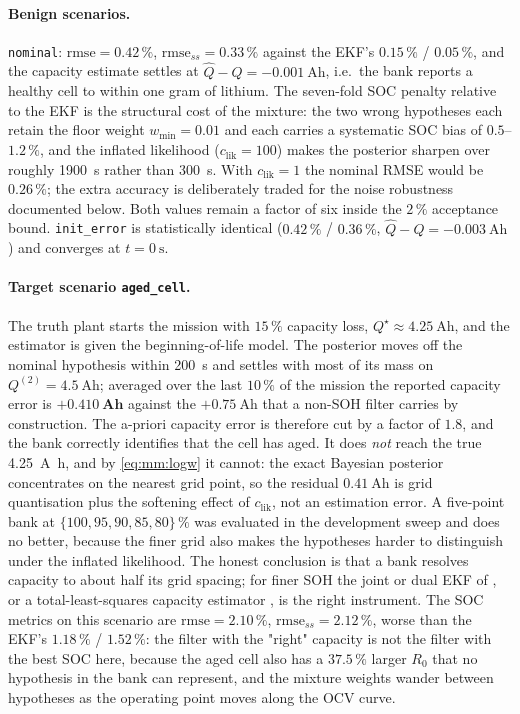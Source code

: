 \paragraph{Benign scenarios.}  \texttt{nominal}: $\mathrm{rmse}=0.42\,\%$,
$\mathrm{rmse}_{ss}=0.33\,\%$ against the EKF's $0.15\,\%$ / $0.05\,\%$, and the capacity estimate
settles at $\hat Q-Q=\SI{-0.001}{\ampere\hour}$, i.e.\ the bank reports a healthy cell to within one
gram of lithium.  The seven-fold SOC penalty relative to the EKF is the structural cost of the
mixture: the two wrong hypotheses each retain the floor weight $w_{\min}=0.01$ and each carries a
systematic SOC bias of $0.5$--$1.2\,\%$, and the inflated likelihood ($c_\mathrm{lik}=100$) makes the
posterior sharpen over roughly \SI{1900}{\second} rather than \SI{300}{\second}.  With
$c_\mathrm{lik}=1$ the nominal RMSE would be $0.26\,\%$; the extra accuracy is deliberately traded for
the noise robustness documented below.  Both values remain a factor of six inside the $2\,\%$
acceptance bound.  \texttt{init\_error} is statistically identical ($0.42\,\%$ / $0.36\,\%$,
$\hat Q-Q=\SI{-0.003}{\ampere\hour}$) and converges at $t=\SI{0}{\second}$.

\paragraph{Target scenario \texttt{aged\_cell}.}  The truth plant starts the mission with $15\,\%$
capacity loss, $Q^\star\approx\SI{4.25}{\ampere\hour}$, and the estimator is given the
beginning-of-life model.  The posterior moves off the nominal hypothesis within \SI{200}{\second} and
settles with most of its mass on $Q^{(2)}=\SI{4.5}{\ampere\hour}$; averaged over the last $10\,\%$ of
the mission the reported capacity error is $\mathbf{+\SI{0.410}{\ampere\hour}}$ against the
$+\SI{0.75}{\ampere\hour}$ that a non-SOH filter carries by construction.  The a-priori capacity error
is therefore cut by a factor of $1.8$, and the bank correctly identifies that the cell has aged.  It
does \emph{not} reach the true \SI{4.25}{\ampere\hour}, and by \eqref{eq:mm:logw} it cannot: the exact
Bayesian posterior concentrates on the nearest grid point, so the residual
$\SI{0.41}{\ampere\hour}$ is grid quantisation plus the softening effect of $c_\mathrm{lik}$, not an
estimation error.  A five-point bank at $\{100,95,90,85,80\}\,\%$ was evaluated in the development
sweep and does no better, because the finer grid also makes the hypotheses harder to distinguish under
the inflated likelihood.  The honest conclusion is that a bank resolves capacity to about half its
grid spacing; for finer SOH the joint or dual EKF of \cite{plett2004ekf3}, or a total-least-squares
capacity estimator \cite{plett2011awtls}, is the right instrument.  The SOC metrics on this scenario
are $\mathrm{rmse}=2.10\,\%$, $\mathrm{rmse}_{ss}=2.12\,\%$, worse than the EKF's $1.18\,\%$ /
$1.52\,\%$: the filter with the "right" capacity is not the filter with the best SOC here, because the
aged cell also has a $37.5\,\%$ larger $R_0$ that no hypothesis in the bank can represent, and the
mixture weights wander between hypotheses as the operating point moves along the OCV curve.

